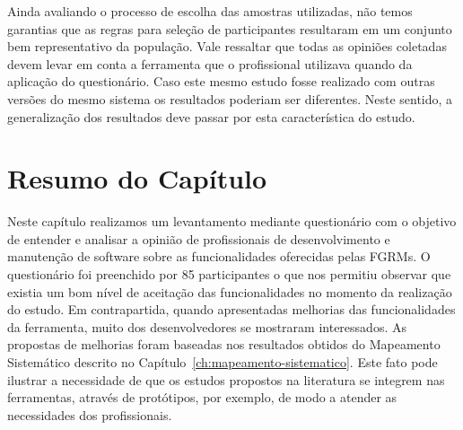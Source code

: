 Ainda avaliando o processo de escolha das amostras utilizadas, não temos
garantias que as regras para seleção de participantes resultaram em um conjunto
bem representativo da população. Vale ressaltar que todas as opiniões coletadas
devem levar em conta a ferramenta que o profissional utilizava quando da
aplicação do questionário. Caso este mesmo estudo fosse realizado com outras
versões do mesmo sistema os resultados poderiam ser diferentes. Neste sentido,
a generalização dos resultados deve passar por esta característica do estudo.

\section{Resumo do Capítulo}\label{sec:resumo_do_capitulo}

Neste capítulo realizamos um levantamento mediante questionário com o objetivo
de entender e analisar a opinião de profissionais de desenvolvimento e
manutenção de software sobre as funcionalidades oferecidas pelas FGRMs. O
questionário foi preenchido por 85 participantes o que nos permitiu observar que
existia um bom nível de aceitação das funcionalidades no momento da realização
do estudo. Em contrapartida, quando apresentadas melhorias das funcionalidades
da ferramenta, muito dos desenvolvedores se mostraram interessados. As propostas
de melhorias foram baseadas nos resultados obtidos do Mapeamento Sistemático
descrito no Capítulo~\ref{ch:mapeamento-sistematico}. Este fato pode ilustrar a
necessidade de que os estudos propostos na literatura se integrem nas
ferramentas, através de protótipos, por exemplo, de modo a atender as
necessidades dos profissionais.
